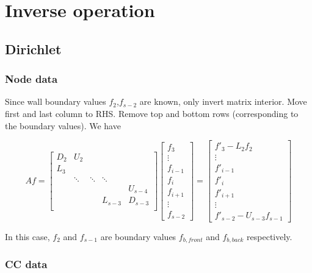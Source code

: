 \documentclass[11pt]{article}
\begin{document}
\section{Inverse operation}
\subsection{Dirichlet}

\subsubsection{Node data}

Since wall boundary values $f_2$,$f_{s-2}$ are known, only invert matrix interior. Move first and last column to RHS. Remove top and bottom rows (corresponding to the boundary values). We have

\[ Af = \left[
\begin{array}{ccccccccc}
D_{2} &  U_{2}   &          &          &          \\
L_{3} &          &          &          &          \\
      &  \ddots  &  \ddots  &  \ddots  &          \\
      &          &          &          &  U_{s-4} \\
      &          &          &  L_{s-3} &  D_{s-3} \\
\end{array} \right] 
\left[ \begin{array}{c}
f_{3} \\ \vdots \\ f_{i-1} \\ f_{i} \\ f_{i+1} \\ \vdots \\ f_{s-2}
\end{array} \right]
=
\left[ \begin{array}{c}
f'_{3} - L_2 f_{2} \\ \vdots \\ f'_{i-1} \\ f'_{i} \\ f'_{i+1} \\ \vdots \\ f'_{s-2} - U_{s-3} f_{s-1}
\end{array} \right]
\]

In this case, $f_2$ and $f_{s-1}$ are boundary values $f_{b,front}$ and $f_{b,back}$ respectively.

\subsubsection{CC data}
\end{document}
